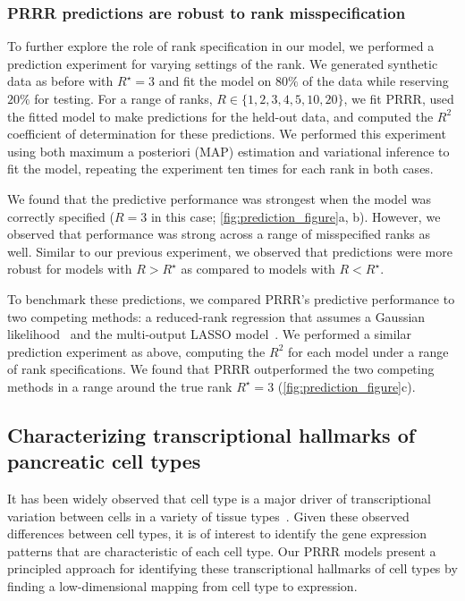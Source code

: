 \documentclass{bmcart}
\begin{document}
\subsubsection*{PRRR predictions are robust to rank misspecification}
To further explore the role of rank specification in our model, we performed a prediction experiment for varying settings of the rank. We generated synthetic data as before with $R^\star = 3$ and fit the model on $80\%$ of the data while reserving $20\%$ for testing. For a range of ranks, $R \in \{1, 2, 3, 4, 5, 10, 20\}$, we fit PRRR, used the fitted model to make predictions for the held-out data, and computed the $R^2$ coefficient of determination for these predictions. We performed this experiment using both maximum a posteriori (MAP) estimation and variational inference to fit the model, repeating the experiment ten times for each rank in both cases. 

We found that the predictive performance was strongest when the model was correctly specified ($R = 3$ in this case; \autoref{fig:prediction_figure}a, b). However, we observed that performance was strong across a range of misspecified ranks as well. Similar to our previous experiment, we observed that predictions were more robust for models with $R > R^\star$ as compared to models with $R < R^\star$.

To benchmark these predictions, we compared PRRR's predictive performance to two competing methods: a reduced-rank regression that assumes a Gaussian likelihood~\citep{anderson1951estimating} and the multi-output LASSO model~\citep{friedman2010note}. We performed a similar prediction experiment as above, computing the $R^2$ for each model under a range of rank specifications. We found that PRRR outperformed the two competing methods in a range around the true rank $R^\star = 3$ (\autoref{fig:prediction_figure}c).

\subsection*{Characterizing transcriptional hallmarks of pancreatic cell types}
It has been widely observed that cell type is a major driver of transcriptional variation between cells in a variety of tissue types~\citep{zheng2017massively,kotliar2019identifying,zeisel2015cell,chen2017single}. Given these observed differences between cell types, it is of interest to identify the gene expression patterns that are characteristic of each cell type. Our PRRR models present a principled approach for identifying these transcriptional hallmarks of cell types by finding a low-dimensional mapping from cell type to expression.
\end{document}

